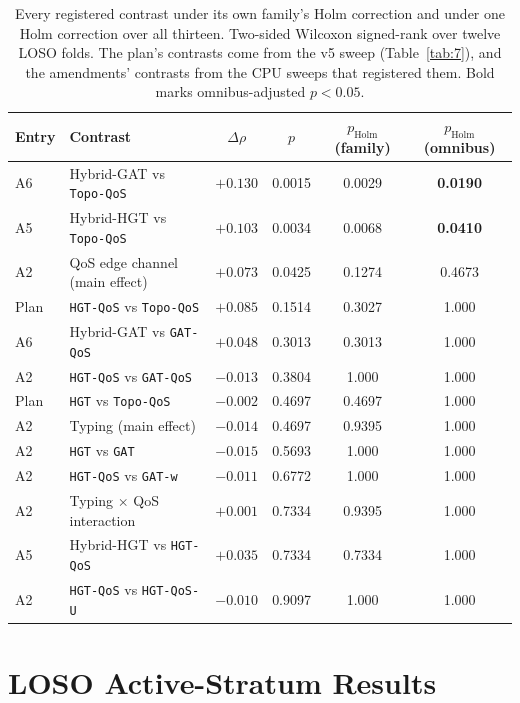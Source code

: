 \documentclass[preprint,3p]{elsarticle}
\begin{document}
\begin{table}[htbp]
\centering
\small
\caption{Every registered contrast under its own family's Holm correction and under one Holm correction over all thirteen. Two-sided Wilcoxon signed-rank over twelve LOSO folds. The plan's contrasts come from the v5 sweep (Table~\ref{tab:7}), and the amendments' contrasts from the CPU sweeps that registered them. Bold marks omnibus-adjusted $p < 0.05$.}
\label{tab:supp-omnibus}
\begin{tabular}{llcccc}
\toprule
\textbf{Entry} & \textbf{Contrast} & \textbf{$\Delta\rho$} & \textbf{$p$} & \textbf{$p_{\text{Holm}}$ (family)} & \textbf{$p_{\text{Holm}}$ (omnibus)} \\
\midrule
A6 & Hybrid-GAT vs \texttt{Topo-QoS} & $+0.130$ & 0.0015 & 0.0029 & \textbf{0.0190} \\
A5 & Hybrid-HGT vs \texttt{Topo-QoS} & $+0.103$ & 0.0034 & 0.0068 & \textbf{0.0410} \\
A2 & QoS edge channel (main effect) & $+0.073$ & 0.0425 & 0.1274 & 0.4673 \\
Plan & \texttt{HGT-QoS} vs \texttt{Topo-QoS} & $+0.085$ & 0.1514 & 0.3027 & 1.000 \\
A6 & Hybrid-GAT vs \texttt{GAT-QoS} & $+0.048$ & 0.3013 & 0.3013 & 1.000 \\
A2 & \texttt{HGT-QoS} vs \texttt{GAT-QoS} & $-0.013$ & 0.3804 & 1.000 & 1.000 \\
Plan & \texttt{HGT} vs \texttt{Topo-QoS} & $-0.002$ & 0.4697 & 0.4697 & 1.000 \\
A2 & Typing (main effect) & $-0.014$ & 0.4697 & 0.9395 & 1.000 \\
A2 & \texttt{HGT} vs \texttt{GAT} & $-0.015$ & 0.5693 & 1.000 & 1.000 \\
A2 & \texttt{HGT-QoS} vs \texttt{GAT-w} & $-0.011$ & 0.6772 & 1.000 & 1.000 \\
A2 & Typing $\times$ QoS interaction & $+0.001$ & 0.7334 & 0.9395 & 1.000 \\
A5 & Hybrid-HGT vs \texttt{HGT-QoS} & $+0.035$ & 0.7334 & 0.7334 & 1.000 \\
A2 & \texttt{HGT-QoS} vs \texttt{HGT-QoS-U} & $-0.010$ & 0.9097 & 1.000 & 1.000 \\
\bottomrule
\end{tabular}
\end{table}

\section{LOSO Active-Stratum Results}
\label{supp:loso-active}
\end{document}

